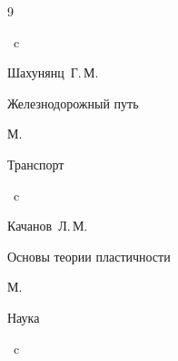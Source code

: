 \begin{thebibliography}{9}

~c




\by Шахунянц~Г.\,М.

\book Железнодорожный путь

\publaddr М.

\publ Транспорт


~c




\by Качанов~Л.\,М.

\book Основы теории пластичности

\publaddr М.

\publ Наука


~c





\end{thebibliography}



\newpage

\makeengtitlem








%

